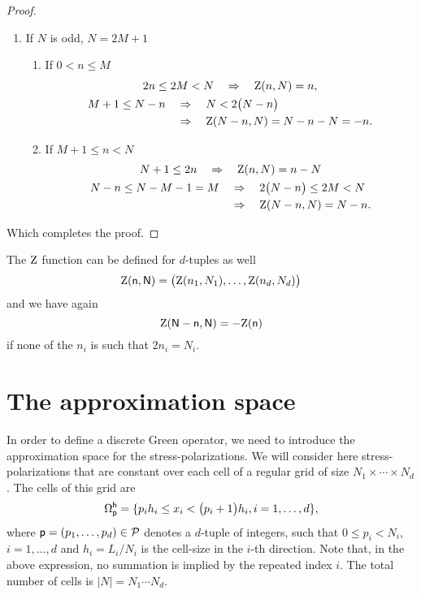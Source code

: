\begin{proof}
\begin{enumerate}
\begin{enumerate}
    \end{enumerate}
  \item If \(N\) is odd, \(N=2M+1\)
    \begin{enumerate}
    \item If \(0<n\leq M\)
      \begin{gather*}
        2n\leq 2M<N\quad\Rightarrow\quad \operatorname{Z}(n, N)=n,\\
        \begin{aligned}
          M+1\leq N-n&\quad\Rightarrow\quad N<2\bigl(N-n\bigr)\\
          &\quad\Rightarrow\quad \operatorname{Z}(N-n, N)=N-n-N=-n.
        \end{aligned}
      \end{gather*}
    \item  If \(M+1\leq n<N\)
      \begin{gather*}
        N+1\leq 2n\quad\Rightarrow\quad \operatorname{Z}(n, N)=n-N\\
        \begin{aligned}
          N-n\leq N-M-1=M&\quad\Rightarrow\quad 2\bigl(N-n\bigr)\leq 2M<N\\
          &\quad\Rightarrow\quad \operatorname{Z}(N-n, N)=N-n.
        \end{aligned}
      \end{gather*}
    \end{enumerate}
  \end{enumerate}
  Which completes the proof.
\end{proof}

The \(\operatorname{Z}\) function can be defined for \(d\)-tuples as well
\begin{equation}
  \mathsf {\operatorname{Z}}(\mathsf n, \mathsf N)
  =\bigl(\operatorname{Z}(n_1, N_1), \ldots, \operatorname{Z}(n_d, N_d)\bigr)
\end{equation}
and we have again
\begin{equation}
  \mathsf {\operatorname{Z}}(\mathsf N-\mathsf n, \mathsf N)=-\mathsf {\operatorname{Z}}(\mathsf n)
\end{equation}
if none of the \(n_i\) is such that \(2n_i=N_i\).

\section{The approximation space}
\label{sec:20210928054031}

In order to define a discrete Green operator, we need to introduce the
approximation space for the stress-polarizations. We will consider here
stress-polarizations that are constant over each cell of a regular grid of size
\(N_1\times\cdots\times N_d\). The cells of this grid are
\begin{equation}
  \Omega_{\mathsf{p}}^{\mathsf{h}}=\{p_ih_i\leq x_i<\bigl(p_i+1\bigr)h_i, i=1,\ldots, d\},
\end{equation}
where \(\mathsf{p}=(p_1,\ldots,p_d)\in\mathcal{P}\) denotes a \(d\)-tuple of
integers, such that \(0\leq p_i<N_i\), \(i=1,\ldots, d\) and \(h_i=L_i/N_i\) is
the cell-size in the \(i\)-th direction. Note that, in the above expression, no
summation is implied by the repeated index \(i\). The total number of cells is
\(\lvert N\rvert=N_1\cdots N_d\).

